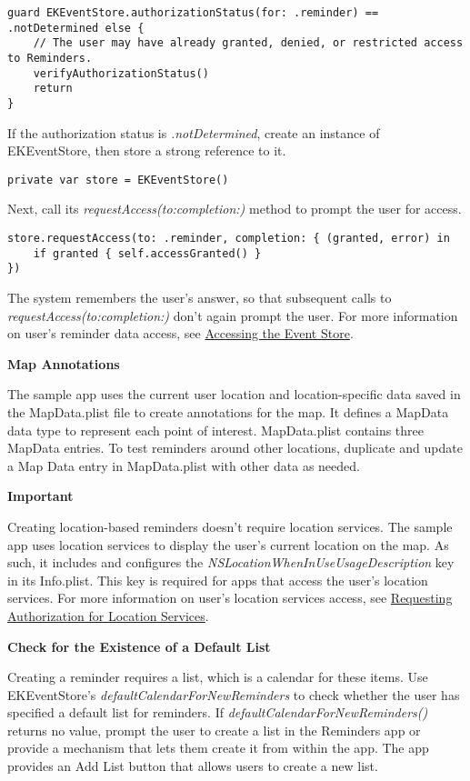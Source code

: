 \documentclass{article}
\begin{document}
\begin{verbatim}
guard EKEventStore.authorizationStatus(for: .reminder) == .notDetermined else {
    // The user may have already granted, denied, or restricted access to Reminders.
    verifyAuthorizationStatus()
    return
}
\end{verbatim}

If the authorization status is \textit{.notDetermined}, create an instance of EKEventStore, then store a strong reference to it.

\begin{verbatim}
private var store = EKEventStore()
\end{verbatim}

Next, call its \textit{requestAccess(to:completion:)} method to prompt the user for access.

\begin{verbatim}
store.requestAccess(to: .reminder, completion: { (granted, error) in
    if granted { self.accessGranted() }
})
\end{verbatim}

The system remembers the user's answer, so that subsequent calls to \textit{requestAccess(to:completion:)} don't again prompt the user. For more information on user's reminder data access, see \href{https://example.com}{Accessing the Event Store}.

\textbf{Map Annotations}

The sample app uses the current user location and location-specific data saved in the MapData.plist file to create annotations for the map. It defines a MapData data type to represent each point of interest. MapData.plist contains three MapData entries. To test reminders around other locations, duplicate and update a Map Data entry in MapData.plist with other data as needed.

\textbf{Important}

Creating location-based reminders doesn't require location services. The sample app uses location services to display the user's current location on the map. As such, it includes and configures the \textit{NSLocationWhenInUseUsageDescription} key in its Info.plist. This key is required for apps that access the user's location services. For more information on user's location services access, see \href{https://example.com}{Requesting Authorization for Location Services}.

\textbf{Check for the Existence of a Default List}

Creating a reminder requires a list, which is a calendar for these items. Use EKEventStore's \textit{defaultCalendarForNewReminders} to check whether the user has specified a default list for reminders. If \textit{defaultCalendarForNewReminders()} returns no value, prompt the user to create a list in the Reminders app or provide a mechanism that lets them create it from within the app. The app provides an Add List button that allows users to create a new list.
\end{document}
